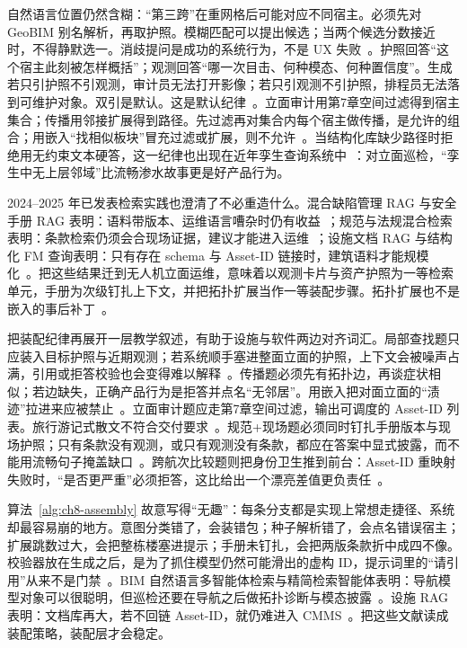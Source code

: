 自然语言位置仍然含糊：``第三跨''在重网格后可能对应不同宿主。必须先对 GeoBIM 别名解析，再取护照。模糊匹配可以提出候选；当两个候选分数接近时，不得静默选一。消歧提问是成功的系统行为，不是 UX 失败~\cite{zhang2025,han2025,guo2025bimllmquery}。护照回答``这个宿主此刻被怎样概括''；观测回答``哪一次目击、何种模态、何种置信度''。生成若只引护照不引观测，审计员无法打开影像；若只引观测不引护照，排程员无法落到可维护对象。双引是默认。这是默认纪律~\cite{pan2024b,zhao2026physical}。立面审计用第7章空间过滤得到宿主集合；传播用邻接扩展得到路径。先过滤再对集合内每个宿主做传播，是允许的组合；用嵌入``找相似板块''冒充过滤或扩展，则不允许~\cite{peng2024,zhang2025}。当结构化库缺少路径时拒绝用无约束文本硬答，这一纪律也出现在近年孪生查询系统中~\cite{pan2026graphdtgpt,buga2025llmfmsql}：对立面巡检，``孪生中无上层邻域''比流畅渗水故事更是好产品行为。

2024--2025 年已发表检索实践也澄清了不必重造什么。混合缺陷管理 RAG 与安全手册 RAG 表明：语料带版本、运维语言嘈杂时仍有收益~\cite{jeon2025hybridrag,lee2024ragsafety}；规范与法规混合检索表明：条款检索仍须会合现场证据，建议才能进入运维~\cite{joffe2025buildingcodes,he2025regulationhybrid,yang2024promptcode}；设施文档 RAG 与结构化 FM 查询表明：只有存在 schema 与 Asset-ID 链接时，建筑语料才能规模化~\cite{krutli2025fmrags,buga2025llmfmsql,arslan2024ragenergy}。把这些结果迁到无人机立面运维，意味着以观测卡片与资产护照为一等检索单元，手册为次级钉扎上下文，并把拓扑扩展当作一等装配步骤。拓扑扩展也不是嵌入的事后补丁~\cite{peng2024,pan2024b,ma2026tenquestions}。




把装配纪律再展开一层教学叙述，有助于设施与软件两边对齐词汇。局部查找题只应装入目标护照与近期观测；若系统顺手塞进整面立面的护照，上下文会被噪声占满，引用或拒答校验也会变得难以解释~\cite{lewis2020,peng2024}。传播题必须先有拓扑边，再谈症状相似；若边缺失，正确产品行为是拒答并点名``无邻居''。用嵌入把对面立面的``渍迹''拉进来应被禁止~\cite{peng2024,jeon2025hybridrag,pan2026graphdtgpt}。立面审计题应走第7章空间过滤，输出可调度的 Asset-ID 列表。旅行游记式散文不符合交付要求~\cite{zhang2025,buga2025llmfmsql}。规范+现场题必须同时钉扎手册版本与现场护照；只有条款没有观测，或只有观测没有条款，都应在答案中显式披露，而不能用流畅句子掩盖缺口~\cite{joffe2025buildingcodes,lee2024ragsafety,he2025regulationhybrid,quan2026bimfacrag}。跨航次比较题则把身份卫生推到前台：Asset-ID 重映射失败时，``是否更严重''必须拒答，这比给出一个漂亮差值更负责任~\cite{zhang2025,yang2025detreconreg,zhao2026physical}。

算法~\ref{alg:ch8-assembly} 故意写得``无趣''：每条分支都是实现上常想走捷径、系统却最容易崩的地方。意图分类错了，会装错包；种子解析错了，会点名错误宿主；扩展跳数过大，会把整栋楼塞进提示；手册未钉扎，会把两版条款折中成四不像。校验器放在生成之后，是为了抓住模型仍然可能滑出的虚构 ID，提示词里的``请引用''从来不是门禁~\cite{ji2023,liang2023helm,ma2026tenquestions}。BIM 自然语言多智能体检索与精简检索智能体表明：导航模型对象可以很聪明，但巡检还要在导航之后做拓扑诊断与模态披露~\cite{hellin2025bimmas,koh2026bimllmretr,liu2025bimcoder}。设施 RAG 表明：文档库再大，若不回链 Asset-ID，就仍难进入 CMMS~\cite{krutli2025fmrags,quan2026bimfacrag,arslan2024ragenergy}。把这些文献读成装配策略，装配层才会稳定。




